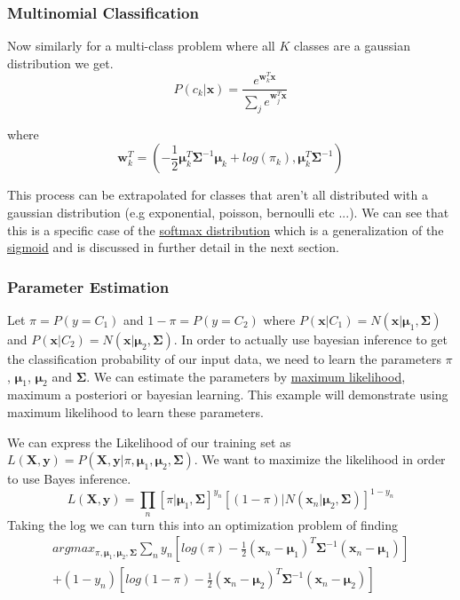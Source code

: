 \documentclass[12pt]{article}
\begin{document}
        \subsubsection{Multinomial Classification}
            Now similarly for a multi-class problem where all $K$ classes are a gaussian distribution we get.
            $$ P(c_k | \boldsymbol{x}) = \frac{e^{\boldsymbol{w}^T_k\boldsymbol{x}}}{\sum_j
            e^{\boldsymbol{w}^T_j\boldsymbol{x}}} $$

            where
            $$ \boldsymbol{w}^T_k = (-\frac{1}{2}\boldsymbol{\mu}^T_k \boldsymbol{\Sigma}^{-1} \boldsymbol{\mu}_k +
            log(\pi_k), \boldsymbol{\mu}_k^T\boldsymbol{\Sigma}^{-1}) $$

            This process can be extrapolated for classes that aren't all distributed with a gaussian distribution (e.g
            exponential, poisson, bernoulli etc ...). We can see that this is a specific case of the
            \hyperref[sec:Softmax]{softmax distribution} which is a generalization of the
            \hyperref[sec:Sigmoid]{sigmoid} and is discussed in further detail in the next section.

        \subsubsection{Parameter Estimation}
            Let $\pi = P(y = C_1)$ and $1 - \pi=P(y = C_2)$ where
            $P(\boldsymbol{x}|C_1)=N(\boldsymbol{x}|\boldsymbol{\mu}_1, \boldsymbol{\Sigma})$ and $P(\boldsymbol{x}|C_2)
            = N(\boldsymbol{x}|\boldsymbol{\mu}_2, \boldsymbol{\Sigma})$. In order to actually use bayesian inference to
            get the classification probability of our input data, we need to learn the parameters $\pi$,
            $\boldsymbol{\mu}_1$, $\boldsymbol{\mu}_2$ and $\boldsymbol{\Sigma}$. We can estimate the parameters by
            \hyperref[sec:ML]{maximum likelihood}, maximum a posteriori or bayesian learning. This example will
            demonstrate using maximum likelihood to learn these parameters.

            We can express the Likelihood of our training set as $L(\boldsymbol{X},\boldsymbol{y}) =
            P(\boldsymbol{X},\boldsymbol{y}|\pi,\boldsymbol{\mu}_1,\boldsymbol{\mu}_2,\boldsymbol{\Sigma})$. We want to
            maximize the likelihood in order to use Bayes inference.
            $$ L(\boldsymbol{X},\boldsymbol{y}) = \prod_{n}{[\pi|\boldsymbol{\mu}_1,
            \boldsymbol{\Sigma}]^{y_n}[(1-\pi)|N(\boldsymbol{x}_n|\boldsymbol{\mu}_2,\boldsymbol{\Sigma})]^{1-y_n}} $$
            Taking the log we can turn this into an optimization problem of finding
            \begin{multline*}
                argmax_{\pi, \boldsymbol{\mu}_1, \boldsymbol{\mu}_2, \boldsymbol{\Sigma}} \sum _{n}y_n[log(\pi) - \frac{1}{2}(\boldsymbol{x}_n - \boldsymbol{\mu}_1)^T \boldsymbol{\Sigma}^{-1}(\boldsymbol{x}_n-\boldsymbol{\mu}_1)]\\ 
                + (1-y_n)[log(1 - \pi) - \frac{1}{2}(\boldsymbol{x}_n - \boldsymbol{\mu}_2)^T \boldsymbol{\Sigma}^{-1}(\boldsymbol{x}_n-\boldsymbol{\mu}_2)]
            \end{multline*}
\end{document}
